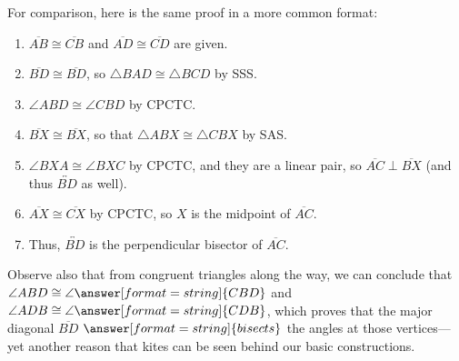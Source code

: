 \documentclass[nooutcomes]{ximera}
\begin{document}
\begin{problem}
\begin{problem}
For comparison, here is the same proof in a more common format:
\begin{enumerate}
\item $\overline{AB}\cong \overline{CB}$ and $\overline{AD}\cong \overline{CD}$ are given.  
\item $\overline{BD}\cong \overline{BD}$, so $\triangle BAD \cong \triangle BCD$ by SSS.  
\item $\angle ABD \cong \angle CBD$ by CPCTC. 
\item $\overline{BX}\cong \overline{BX}$, so that $\triangle ABX \cong \triangle CBX$ by SAS.  
\item $\angle BXA \cong \angle BXC$ by CPCTC, and they are a linear pair, 
so $\overline{AC}\perp\overline{BX}$ (and thus $\overleftrightarrow{BD}$ as well). 
\item $\overline{AX}\cong \overline{CX}$ by CPCTC, so $X$ is the midpoint of $\overline{AC}$.
\item Thus, $\overleftrightarrow{BD}$ is the perpendicular bisector of $\overline{AC}$.
\end{enumerate}

Observe also that from congruent triangles along the way, we can conclude that 
$\angle ABD\cong \angle \answer[format=string]{CBD}$ and $\angle ADB \cong \angle \answer[format=string]{CDB}$, 
which proves that the major diagonal $\overline{BD}$ $\answer[format=string]{bisects}$ the angles at those vertices---yet 
another reason that kites can be seen behind our basic constructions.  

\end{problem}

\end{problem}
\end{document}
